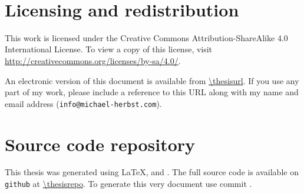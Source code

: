\clearpage
\ifodd\value{page}\hbox{}\newpage\fi

\thispagestyle{plain}
\
\vfill
\section*{Licensing and redistribution}
{}

This work is licensed under the Creative Commons Attribution-ShareAlike 4.0
International License.
To view a copy of this license,
visit \url{http://creativecommons.org/licenses/by-sa/4.0/}.
\begin{center}
\end{center}
An electronic version of this document is available from
\url{\thesisurl}.
If you use any part of my work,
please include a reference to this URL along with my name and email address
(\texttt{info@michael-herbst.com}).

\section*{Source code repository}
{}
This thesis was generated using \LaTeX, \python and \molsturm.
The full source code is available
on \texttt{github} at \url{\thesisrepo}.
To generate this very document use commit \texttt{\gitcommit}.
